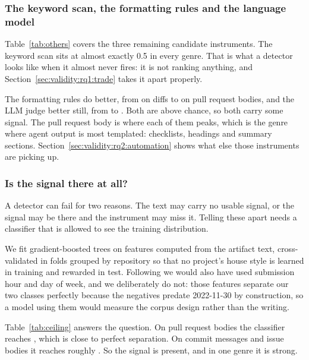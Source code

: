 \subsubsection{The keyword scan, the formatting rules and the language model}
\label{sec:validity:rq1:others}



Table~\ref{tab:others} covers the three remaining candidate instruments. The keyword
scan sits at almost exactly 0.5 in every genre. That is what a detector looks like when
it almost never fires: it is not ranking anything, and Section~\ref{sec:validity:rq1:trade}
takes it apart properly.

The formatting rules do better, from  on diffs to  on
pull request bodies, and the LLM judge better still, from  to
. Both are above chance, so both carry some signal. The pull request
body is where each of them peaks, which is the genre where agent output is most
templated: checklists, headings and summary sections. Section~\ref{sec:validity:rq2:automation}
shows what else those instruments are picking up.

\subsubsection{Is the signal there at all?}
\label{sec:validity:ceiling}

A detector can fail for two reasons. The text may carry no usable signal, or the signal
may be there and the instrument may miss it. Telling these apart needs a classifier that
is allowed to see the training distribution.

We fit gradient-boosted trees on  features computed from the artifact text,
cross-validated in folds grouped by repository so that no project's house style is
learned in training and rewarded in test. Following
\citet{ghaleb2026fingerprinting} we would also have used submission hour and day of
week, and we deliberately do not: those features separate our two classes perfectly
because the negatives predate 2022-11-30 by construction, so a model using them would
measure the corpus design rather than the writing.



Table~\ref{tab:ceiling} answers the question. On pull request bodies the classifier
reaches \CeilingAurocMax{}, which is close to perfect separation. On commit messages and
issue bodies it reaches roughly . So the signal is present, and in one
genre it is strong.

